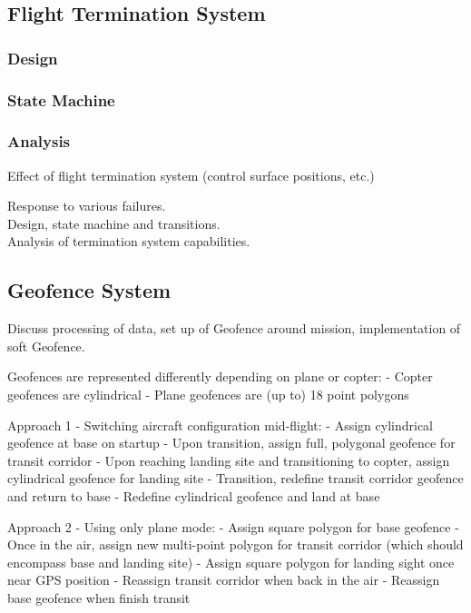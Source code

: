 \subsection{Flight Termination System}
\subsubsection{Design}

\subsubsection{State Machine}

\subsubsection{Analysis}
Effect of flight termination system (control surface positions, etc.)

Response to various failures.\\

Design, state machine and transitions.\\

Analysis of termination system capabilities.

\subsection{Geofence System}
Discuss processing of data, set up of Geofence around mission, implementation of soft Geofence.

Geofences are represented differently depending on plane or copter:
- Copter geofences are cylindrical
- Plane geofences are (up to) 18 point polygons

Approach 1 - Switching aircraft configuration mid-flight:
- Assign cylindrical geofence at base on startup
- Upon transition, assign full, polygonal geofence for transit corridor
- Upon reaching landing site and transitioning to copter, assign cylindrical geofence for landing site
- Transition, redefine transit corridor geofence and return to base
- Redefine cylindrical geofence and land at base

Approach 2 - Using only plane mode:
- Assign square polygon for base geofence
- Once in the air, assign new multi-point polygon for transit corridor (which should encompass base and landing site)
- Assign square polygon for landing sight once near GPS position
- Reassign transit corridor when back in the air
- Reassign base geofence when finish transit


